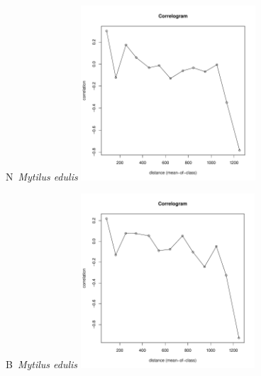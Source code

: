 \documentclass[12pt, a4paper]{disser}
\begin{document}
	\begin{figure}[h]

	\begin{minipage}[b]{.46\linewidth}
	\begin{center}
	{\small N~{\it Mytilus edulis}}
		\includegraphics[width=65mm]{../Barenc_Sea/distribution_Moran/Plyazh07_moran_N_Mytilus_edulis_.pdf}
	\end{center}
	\end{minipage}
%
	\hfil %
%
	\begin{minipage}[b]{.46\linewidth}
	\begin{center}
	{\small B~{\it Mytilus edulis}}
		\includegraphics[width=65mm]{../Barenc_Sea/distribution_Moran/Plyazh07_moran_B_Mytilus_edulis_.pdf}
	\end{center}
	\end{minipage}


\end{figure}
\end{document}

